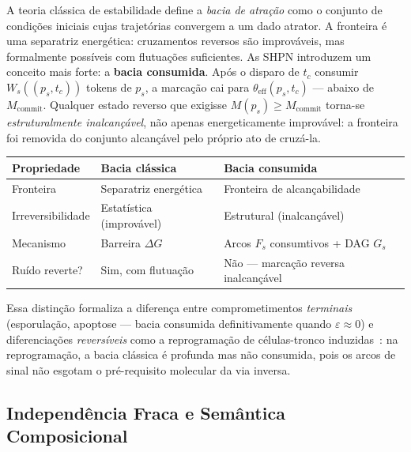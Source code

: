 \begin{remark}
\label{rem:bacia-consumida}
A teoria clássica de estabilidade \parencite{Strogatz2015} define a \emph{bacia
de atração} como o conjunto de condições iniciais cujas trajetórias convergem a
um dado atrator.  A fronteira é uma separatriz energética: cruzamentos reversos
são improváveis, mas formalmente possíveis com flutuações suficientes.
As SHPN introduzem um conceito mais forte: a \textbf{bacia consumida}.
Após o disparo de $t_c$ consumir $W_s((p_s,t_c))$ tokens de $p_s$, a marcação
cai para $\theta_{\mathrm{eff}}(p_s,t_c)$ --- abaixo de $M_\text{commit}$.
Qualquer estado reverso que exigisse $M(p_s) \geq M_\text{commit}$
torna-se \emph{estruturalmente inalcançável}, não apenas energeticamente
improvável: a fronteira foi removida do conjunto alcançável pelo próprio ato de
cruzá-la.

\begin{center}\small
\begin{tabular}{@{}p{3.2cm}p{4.0cm}p{4.0cm}@{}}
\toprule
Propriedade & Bacia clássica & Bacia consumida \\
\midrule
Fronteira & Separatriz energética & Fronteira de alcançabilidade \\
Irreversibilidade & Estatística (improvável) & Estrutural (inalcançável) \\
Mecanismo & Barreira $\Delta G$ & Arcos $F_s$ consumtivos + DAG $G_s$ \\
Ruído reverte? & Sim, com flutuação & Não --- marcação reversa inalcançável \\
\bottomrule
\end{tabular}
\end{center}

Essa distinção formaliza a diferença entre comprometimentos \emph{terminais}
(esporulação, apoptose --- bacia consumida definitivamente quando $\varepsilon
\approx 0$) e diferenciações \emph{reversíveis} como a reprogramação de
células-tronco induzidas~\parencite{Takahashi2006}: na reprogramação, a bacia
clássica é profunda mas não consumida, pois os arcos de sinal não esgotam o
pré-requisito molecular da via inversa.
\end{remark}

\subsection{Independência Fraca e Semântica Composicional}
\label{subsec:independencia-fraca}

